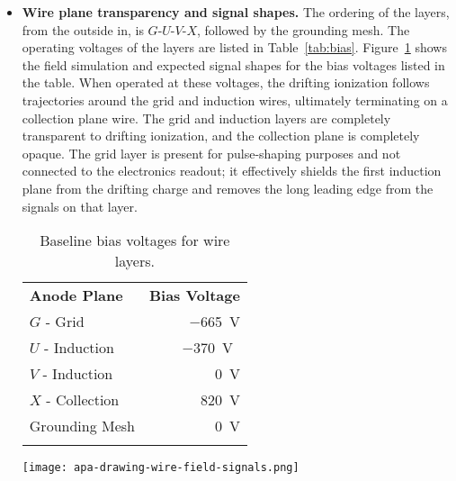 \begin{itemize}
\item \textbf{Wire plane transparency and signal shapes.}  The ordering of the layers, from the outside in, is $G$-$U$-$V$-$X$, followed by the grounding mesh. The operating voltages of the  layers are listed in Table~\ref{tab:bias}.  Figure~\ref{fig:apa-fields} shows the field simulation and expected signal shapes for the bias voltages listed in the table.  When operated at these voltages, the drifting ionization follows trajectories around the grid and induction wires, ultimately terminating on a collection plane wire. The grid and induction layers are completely transparent to drifting ionization, and the collection plane is completely opaque.  The grid layer is present for pulse-shaping purposes and not connected to the electronics readout; it effectively shields the first induction plane from the drifting charge and removes the long leading edge from the signals on that layer. 


\begin{table}[ht]
\begin{minipage}[b]{0.46\linewidth}
\centering
\begin{tabular}{ l  r }
    \hline
    \textbf{Anode Plane} & \textbf{Bias Voltage} \\ \toprowrule
	$G$ - Grid & \SI{-665}{V} \\ \colhline
	$U$ - Induction & \SI{-370}{V{}} \\ \colhline
	$V$ - Induction & \SI{0}{V} \\ \colhline
	$X$ - Collection & \SI{820}{V} \\ \colhline
	Grounding Mesh & \SI{0}{V} \\ \colhline
    \end{tabular}
    \caption{Baseline bias voltages for  wire layers.}
    \label{tab:bias}
\end{minipage}\hfill
\begin{minipage}[t]{0.5\linewidth}
\centering
\texttt{[image: apa-drawing-wire-field-signals.png]}
\label{fig:apa-fields}
\end{minipage}
\end{table}


\end{itemize}
